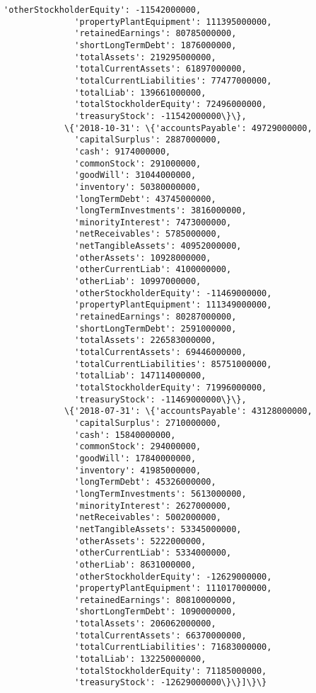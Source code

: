 \documentclass[11pt]{article}
\begin{document}
\begin{Verbatim}[commandchars=\\\{\}]
              'otherStockholderEquity': -11542000000,
              'propertyPlantEquipment': 111395000000,
              'retainedEarnings': 80785000000,
              'shortLongTermDebt': 1876000000,
              'totalAssets': 219295000000,
              'totalCurrentAssets': 61897000000,
              'totalCurrentLiabilities': 77477000000,
              'totalLiab': 139661000000,
              'totalStockholderEquity': 72496000000,
              'treasuryStock': -11542000000\}\},
            \{'2018-10-31': \{'accountsPayable': 49729000000,
              'capitalSurplus': 2887000000,
              'cash': 9174000000,
              'commonStock': 291000000,
              'goodWill': 31044000000,
              'inventory': 50380000000,
              'longTermDebt': 43745000000,
              'longTermInvestments': 3816000000,
              'minorityInterest': 7473000000,
              'netReceivables': 5785000000,
              'netTangibleAssets': 40952000000,
              'otherAssets': 10928000000,
              'otherCurrentLiab': 4100000000,
              'otherLiab': 10997000000,
              'otherStockholderEquity': -11469000000,
              'propertyPlantEquipment': 111349000000,
              'retainedEarnings': 80287000000,
              'shortLongTermDebt': 2591000000,
              'totalAssets': 226583000000,
              'totalCurrentAssets': 69446000000,
              'totalCurrentLiabilities': 85751000000,
              'totalLiab': 147114000000,
              'totalStockholderEquity': 71996000000,
              'treasuryStock': -11469000000\}\},
            \{'2018-07-31': \{'accountsPayable': 43128000000,
              'capitalSurplus': 2710000000,
              'cash': 15840000000,
              'commonStock': 294000000,
              'goodWill': 17840000000,
              'inventory': 41985000000,
              'longTermDebt': 45326000000,
              'longTermInvestments': 5613000000,
              'minorityInterest': 2627000000,
              'netReceivables': 5002000000,
              'netTangibleAssets': 53345000000,
              'otherAssets': 5222000000,
              'otherCurrentLiab': 5334000000,
              'otherLiab': 8631000000,
              'otherStockholderEquity': -12629000000,
              'propertyPlantEquipment': 111017000000,
              'retainedEarnings': 80810000000,
              'shortLongTermDebt': 1090000000,
              'totalAssets': 206062000000,
              'totalCurrentAssets': 66370000000,
              'totalCurrentLiabilities': 71683000000,
              'totalLiab': 132250000000,
              'totalStockholderEquity': 71185000000,
              'treasuryStock': -12629000000\}\}]\}\}
\end{Verbatim}
            
\end{document}
